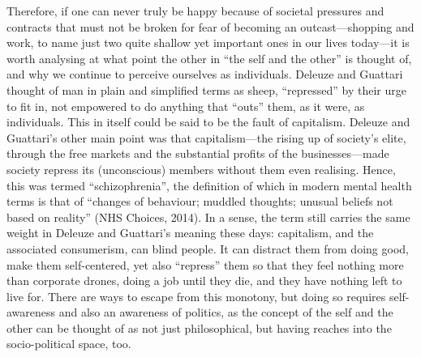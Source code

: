 \documentclass[12pt,a4paper]{article}
\begin{document}
Therefore, if one can never truly be happy because of societal
pressures and contracts that must not be broken for fear of becoming
an outcast---shopping and work, to name just two quite shallow yet
important ones in our lives today---it is worth analysing at what
point the other in ``the self and the other'' is thought of, and why
we continue to perceive ourselves as individuals. Deleuze and Guattari
thought of man in plain and simplified terms as sheep, ``repressed''
by their urge to fit in, not empowered to do anything that ``outs''
them, as it were, as individuals. This in itself could be said to be
the fault of capitalism. Deleuze and Guattari's other main point was
that capitalism---the rising up of society's elite, through the free
markets and the substantial profits of the businesses---made society
repress its (unconscious) members without them even realising. Hence,
this was termed ``schizophrenia'', the definition of which in modern
mental health terms is that of ``changes of behaviour; muddled
thoughts; unusual beliefs not based on reality'' (NHS Choices,
2014). In a sense, the term still carries the same weight in Deleuze
and Guattari's meaning these days: capitalism, and the associated
consumerism, can blind people. It can distract them from doing good,
make them self-centered, yet also ``repress'' them so that they feel
nothing more than corporate drones, doing a job until they die, and
they have nothing left to live for. There are ways to escape from this
monotony, but doing so requires self-awareness and also an awareness
of politics, as the concept of the self and the other can be thought
of as not just philosophical, but having reaches into the
socio-political space, too.\\
\end{document}
